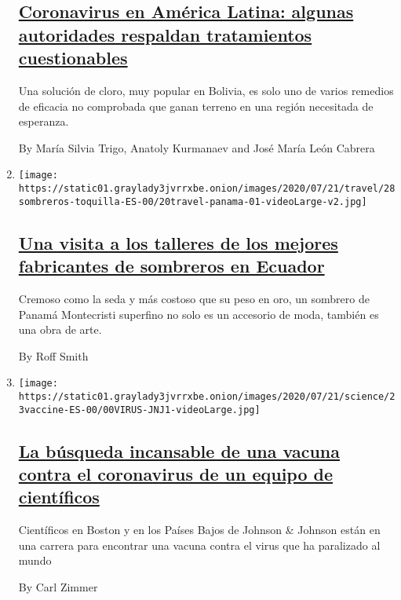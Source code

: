 \begin{enumerate}
  \hypertarget{coronavirus-en-amuxe9rica-latina-algunas-autoridades-respaldan-tratamientos-cuestionables}{%
  \subsection{\texorpdfstring{\href{/es/2020/07/23/espanol/america-latina/bolivia-cloro-coronavirus-ivermectina.html}{Coronavirus
  en América Latina: algunas autoridades respaldan tratamientos
  cuestionables}}{Coronavirus en América Latina: algunas autoridades respaldan tratamientos cuestionables}}\label{coronavirus-en-amuxe9rica-latina-algunas-autoridades-respaldan-tratamientos-cuestionables}}

  Una solución de cloro, muy popular en Bolivia, es solo uno de varios
  remedios de eficacia no comprobada que ganan terreno en una región
  necesitada de esperanza.

  By María Silvia Trigo, Anatoly Kurmanaev and José María León Cabrera
\item
  \texttt{[image: https://static01.graylady3jvrrxbe.onion/images/2020/07/21/travel/28sombreros-toquilla-ES-00/20travel-panama-01-videoLarge-v2.jpg]}

  \hypertarget{una-visita-a-los-talleres-de-los-mejores-fabricantes-de-sombreros-en-ecuador}{%
  \subsection{\texorpdfstring{\href{/es/2020/07/28/espanol/estilos-de-vida/sombreros-toquilla-panama-ecuador.html}{Una
  visita a los talleres de los mejores fabricantes de sombreros en
  Ecuador}}{Una visita a los talleres de los mejores fabricantes de sombreros en Ecuador}}\label{una-visita-a-los-talleres-de-los-mejores-fabricantes-de-sombreros-en-ecuador}}

  Cremoso como la seda y más costoso que su peso en oro, un sombrero de
  Panamá Montecristi superfino no solo es un accesorio de moda, también
  es una obra de arte.

  By Roff Smith
\item
  \texttt{[image: https://static01.graylady3jvrrxbe.onion/images/2020/07/21/science/23vaccine-ES-00/00VIRUS-JNJ1-videoLarge.jpg]}

  \hypertarget{la-buxfasqueda-incansable-de-una-vacuna-contra-el-coronavirus-de-un-equipo-de-cientuxedficos}{%
  \subsection{\texorpdfstring{\href{/es/2020/07/23/espanol/ciencia-y-tecnologia/vacuna-coronavirus.html}{La
  búsqueda incansable de una vacuna contra el coronavirus de un equipo
  de
  científicos}}{La búsqueda incansable de una vacuna contra el coronavirus de un equipo de científicos}}\label{la-buxfasqueda-incansable-de-una-vacuna-contra-el-coronavirus-de-un-equipo-de-cientuxedficos}}

  Científicos en Boston y en los Países Bajos de Johnson \& Johnson
  están en una carrera para encontrar una vacuna contra el virus que ha
  paralizado al mundo

  By Carl Zimmer
\end{enumerate}

